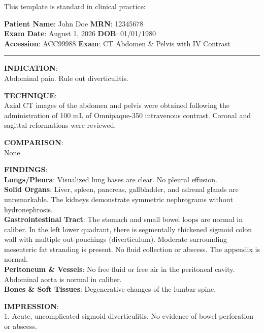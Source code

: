 This template is standard in clinical practice:

\begin{testbox}
\begin{tabbing}
\textbf{Patient Name}: \= John Doe \hspace{4cm} \= \textbf{MRN}: 12345678 \\
\textbf{Exam Date}: \> August 1, 2026 \> \textbf{DOB}: 01/01/1980 \\
\textbf{Accession}: \> ACC99988 \> \textbf{Exam}: CT Abdomen \& Pelvis with IV Contrast
\end{tabbing}

\noindent\rule{\textwidth}{0.4pt}

\textbf{INDICATION}: \\
Abdominal pain. Rule out diverticulitis.

\textbf{TECHNIQUE}: \\
Axial CT images of the abdomen and pelvis were obtained following the administration of 100 mL of Omnipaque-350 intravenous contrast. Coronal and sagittal reformations were reviewed.

\textbf{COMPARISON}: \\
None.

\textbf{FINDINGS}: \\
\textbf{Lungs/Pleura}: Visualized lung bases are clear. No pleural effusion.\\
\textbf{Solid Organs}: Liver, spleen, pancreas, gallbladder, and adrenal glands are unremarkable. The kidneys demonstrate symmetric nephrograms without hydronephrosis.\\
\textbf{Gastrointestinal Tract}: The stomach and small bowel loops are normal in caliber. In the left lower quadrant, there is segmentally thickened sigmoid colon wall with multiple out-pouchings (diverticulum). Moderate surrounding mesenteric fat stranding is present. No fluid collection or abscess. The appendix is normal.\\
\textbf{Peritoneum \& Vessels}: No free fluid or free air in the peritoneal cavity. Abdominal aorta is normal in caliber.\\
\textbf{Bones \& Soft Tissues}: Degenerative changes of the lumbar spine.

\textbf{IMPRESSION}: \\
1. Acute, uncomplicated sigmoid diverticulitis. No evidence of bowel perforation or abscess.
\end{testbox}

\clearpage
